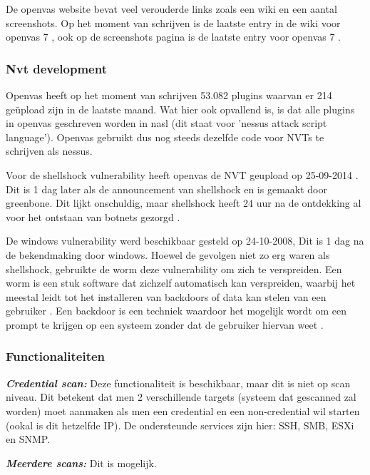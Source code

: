 De openvas website bevat veel verouderde links zoals een wiki en een aantal screenshots. Op het moment van schrijven is de laatste entry in de wiki voor openvas 7 \textcite{Openvas-wiki}, ook op de screenshots pagina is de laatste entry voor openvas 7 \textcite{Openvas-screenshots}.

\subsubsection{Nvt development}

Openvas heeft op het moment van schrijven 53.082 plugins \textcite{Openvas-nvt} waarvan er 214 geüpload zijn in de laatste maand. Wat hier ook opvallend is, is dat alle plugins in openvas geschreven worden in nasl (dit staat voor 'nessus attack script language'). Openvas gebruikt dus nog steeds dezelfde code voor NVTs te schrijven als nessus. 

Voor de shellshock vulnerability heeft openvas de NVT geupload op 25-09-2014 \textcite{Vulners-shellshock-openvas}. Dit is 1 dag later als de announcement van shellshock en is gemaakt door greenbone. Dit lijkt onschuldig, maar shellshock heeft 24 uur na de ontdekking al voor het ontstaan van botnets gezorgd \textcite{wired-shellshock}. 

De windows vulnerability werd beschikbaar gesteld op 24-10-2008, Dit is 1 dag na de bekendmaking door windows. Hoewel de gevolgen niet zo erg waren als shellshock, gebruikte de worm \textcite{Microsoft} deze vulnerability om zich te verspreiden. Een worm is een stuk software dat zichzelf automatisch kan verspreiden, waarbij het meestal leidt tot het installeren van backdoors of data kan stelen van een gebruiker \textcite{pctools-worm}. Een backdoor is een techniek waardoor het mogelijk wordt om een prompt te krijgen op een systeem zonder dat de gebruiker hiervan weet \textcite{techopedia-backdoor}.

\subsubsection{Functionaliteiten}

\textbf{\textit{Credential scan: }} Deze functionaliteit is beschikbaar, maar dit is niet op scan niveau. Dit betekent dat men 2 verschillende targets (systeem dat gescanned zal worden) moet aanmaken als men een credential en een non-credential wil starten (ookal is dit hetzelfde IP). De ondersteunde services zijn hier: SSH, SMB, ESXi en SNMP.

\textbf{\textit{Meerdere scans: }} Dit is mogelijk.

